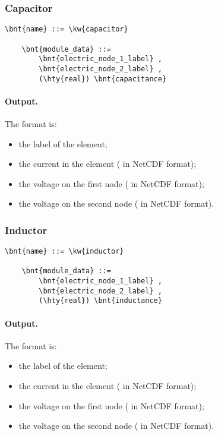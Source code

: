 \subsubsection{Capacitor}
\begin{Verbatim}[commandchars=\\\{\}]
    \bnt{name} ::= \kw{capacitor}

    \bnt{module_data} ::=
        \bnt{electric_node_1_label} ,
        \bnt{electric_node_2_label} ,
        (\hty{real}) \bnt{capacitance}
\end{Verbatim}

\paragraph{Output.}
\label{sec:MODULE:FAB-ELECTRIC:CAPACITOR:OUTPUT}
The format is:
\begin{itemize}
\item the label of the element;
\item the current in the element ( in NetCDF format);
\item the voltage on the first node ( in NetCDF format);
\item the voltage on the second node ( in NetCDF format).
\end{itemize}

\subsubsection{Inductor}
\begin{Verbatim}[commandchars=\\\{\}]
    \bnt{name} ::= \kw{inductor}

    \bnt{module_data} ::=
        \bnt{electric_node_1_label} ,
        \bnt{electric_node_2_label} ,
        (\hty{real}) \bnt{inductance}
\end{Verbatim}

\paragraph{Output.}
\label{sec:MODULE:FAB-ELECTRIC:INDUCTOR:OUTPUT}
The format is:
\begin{itemize}
\item the label of the element;
\item the current in the element ( in NetCDF format);
\item the voltage on the first node ( in NetCDF format);
\item the voltage on the second node ( in NetCDF format).
\end{itemize}

